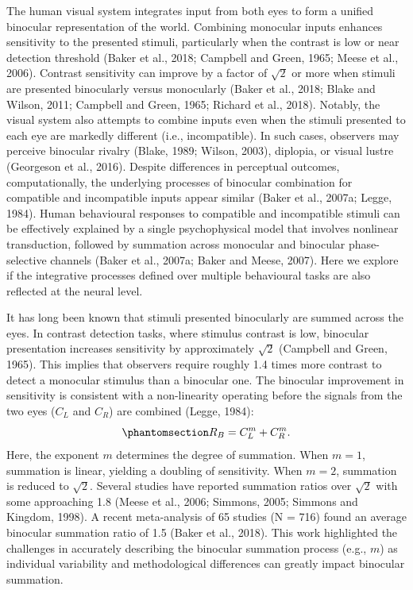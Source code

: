 \documentclass[
  12pt,
]{article}
\begin{document}
The human visual system integrates input from both eyes to form a
unified binocular representation of the world. Combining monocular
inputs enhances sensitivity to the presented stimuli, particularly when
the contrast is low or near detection threshold (Baker et al., 2018;
Campbell and Green, 1965; Meese et al., 2006). Contrast sensitivity can
improve by a factor of \(\sqrt{2}\) or more when stimuli are presented
binocularly versus monocularly (Baker et al., 2018; Blake and Wilson,
2011; Campbell and Green, 1965; Richard et al., 2018). Notably, the
visual system also attempts to combine inputs even when the stimuli
presented to each eye are markedly different (i.e., incompatible). In
such cases, observers may perceive binocular rivalry (Blake, 1989;
Wilson, 2003), diplopia, or visual lustre (Georgeson et al., 2016).
Despite differences in perceptual outcomes, computationally, the
underlying processes of binocular combination for compatible and
incompatible inputs appear similar (Baker et al., 2007a; Legge, 1984).
Human behavioural responses to compatible and incompatible stimuli can
be effectively explained by a single psychophysical model that involves
nonlinear transduction, followed by summation across monocular and
binocular phase-selective channels (Baker et al., 2007a; Baker and
Meese, 2007). Here we explore if the integrative processes defined over
multiple behavioural tasks are also reflected at the neural level.

It has long been known that stimuli presented binocularly are summed
across the eyes. In contrast detection tasks, where stimulus contrast is
low, binocular presentation increases sensitivity by approximately
\(\sqrt{2}\) (Campbell and Green, 1965). This implies that observers
require roughly 1.4 times more contrast to detect a monocular stimulus
than a binocular one. The binocular improvement in sensitivity is
consistent with a non-linearity operating before the signals from the
two eyes (\(C_L\) and \(C_R\)) are combined (Legge, 1984):
\begin{equation}\phantomsection\label{eq-IntroMath1}{
R_B = C_L^m + C_R^m.
}\end{equation} Here, the exponent \(m\) determines the degree of
summation. When \(m = 1\), summation is linear, yielding a doubling of
sensitivity. When \(m = 2\), summation is reduced to \(\sqrt{2}\).
Several studies have reported summation ratios over \(\sqrt{2}\) with
some approaching 1.8 (Meese et al., 2006; Simmons, 2005; Simmons and
Kingdom, 1998). A recent meta-analysis of 65 studies (N = 716) found an
average binocular summation ratio of 1.5 (Baker et al., 2018). This work
highlighted the challenges in accurately describing the binocular
summation process (e.g., \(m\)) as individual variability and
methodological differences can greatly impact binocular summation.
\end{document}
